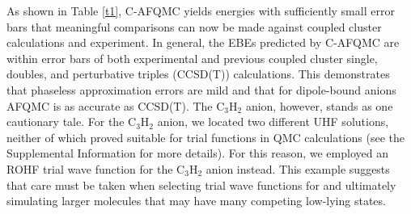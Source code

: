 As shown in Table \ref{t1}, C-AFQMC yields energies with sufficiently small error bars that meaningful comparisons can now be made against coupled cluster calculations and experiment. In general, the EBEs predicted by C-AFQMC are within error bars of both experimental and previous coupled cluster single, doubles, and perturbative triples (CCSD(T)) calculations. This demonstrates that phaseless approximation errors are mild and that for dipole-bound anions AFQMC is as accurate as CCSD(T). The C$_{3}$H$_{2}$ anion, however, stands as one cautionary tale. For the C$_{3}$H$_{2}$ anion, we located two different UHF solutions, neither of which proved suitable for trial functions in QMC calculations (see the
Supplemental Information for more details). For this reason, we employed an ROHF trial wave function for the C$_{3}$H$_{2}$ anion instead. This example suggests that care must be taken when selecting trial wave functions for and ultimately simulating larger molecules that may have many competing low-lying states.
